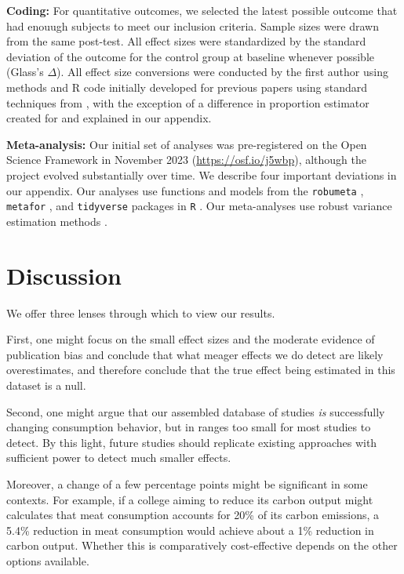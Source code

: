 \documentclass[sn-nature,referee,pdflatex]{sn-jnl}
\begin{document}
\textbf{Coding:} For quantitative outcomes, we selected the latest
possible outcome that had enouugh subjects to meet our inclusion
criteria. Sample sizes were drawn from the same post-test. All effect
sizes were standardized by the standard deviation of the outcome for the
control group at baseline whenever possible (Glass's \(\Delta\)). All
effect size conversions were conducted by the first author using methods
and R code initially developed for previous papers
\citep{paluck2019, paluck2021, porat2024} using standard techniques from
\citep{cooper2019}, with the exception of a difference in proportion
estimator created for \citep{paluck2021} and explained in our appendix.

\textbf{Meta-analysis:} Our initial set of analyses was pre-registered
on the Open Science Framework in November 2023
(\url{https://osf.io/j5wbp}), although the project evolved substantially
over time. We describe four important deviations in our appendix. Our
analyses use functions and models from the \texttt{robumeta}
\citep{fisher2015}, \texttt{metafor} \citep{viechtbauer2010}, and
\texttt{tidyverse} \citep{wickham2019} packages in \texttt{R}
\citep{Rlang}. Our meta-analyses use robust variance estimation methods
\citep{hedges2010}.

\section{Discussion}\label{Sec4}

We offer three lenses through which to view our results.

First, one might focus on the small effect sizes and the moderate
evidence of publication bias and conclude that what meager effects we do
detect are likely overestimates, and therefore conclude that the true
effect being estimated in this dataset is a null.

Second, one might argue that our assembled database of studies \emph{is}
successfully changing consumption behavior, but in ranges too small for
most studies to detect. By this light, future studies should replicate
existing approaches with sufficient power to detect much smaller
effects.

Moreover, a change of a few percentage points might be significant in
some contexts. For example, if a college aiming to reduce its carbon
output might calculates that meat consumption accounts for 20\% of its
carbon emissions, a 5.4\% reduction in meat consumption
\citep{jalil2023} would achieve about a 1\% reduction in carbon output.
Whether this is comparatively cost-effective depends on the other
options available.
\end{document}
